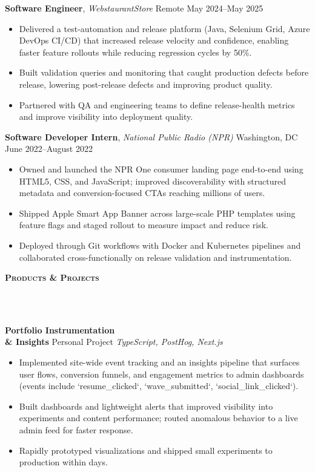 \documentclass[10pt]{article}
\newcommand{\lineunder} {
    \vspace*{-10pt} \\
    \hspace*{-18pt} \hrulefill \\
    \vspace*{2pt}
}
\newcommand{\header} [1] {
  \vspace*{2pt}
    {\hspace*{-15pt}\textsc{#1}}
    \lineunder
}
\begin{document}
\textbf{Software Engineer}, \textit{WebstaurantStore} \hfill Remote \textbar{} May 2024--May 2025\\
\begin{itemize}[leftmargin=5mm, itemsep=0mm]
  \item Delivered a test-automation and release platform (Java, Selenium Grid, Azure DevOps CI/CD) that increased release velocity and confidence, enabling faster feature rollouts while reducing regression cycles by 50\%.
  \item Built validation queries and monitoring that caught production defects before release, lowering post-release defects and improving product quality.
  \item Partnered with QA and engineering teams to define release-health metrics and improve visibility into deployment quality.
\end{itemize}

\textbf{Software Developer Intern}, \textit{National Public Radio (NPR)} \hfill Washington, DC \textbar{} June 2022--August 2022\\
\begin{itemize}[leftmargin=5mm, itemsep=0mm]
  \item Owned and launched the NPR One consumer landing page end-to-end using HTML5, CSS, and JavaScript; improved discoverability with structured metadata and conversion-focused CTAs reaching millions of users.
  \item Shipped Apple Smart App Banner across large-scale PHP templates using feature flags and staged rollout to measure impact and reduce risk.
  \item Deployed through Git workflows with Docker and Kubernetes pipelines and collaborated cross-functionally on release validation and instrumentation.
\end{itemize}

\header{\textbf{Products \& Projects}}

\textbf{Portfolio Instrumentation \\& Insights} \hfill Personal Project \textbar{} \textit{TypeScript, PostHog, Next.js}\\
\begin{itemize}[leftmargin=5mm, itemsep=0mm]
  \item Implemented site-wide event tracking and an insights pipeline that surfaces user flows, conversion funnels, and engagement metrics to admin dashboards (events include `resume_clicked`, `wave_submitted`, `social_link_clicked`).
  \item Built dashboards and lightweight alerts that improved visibility into experiments and content performance; routed anomalous behavior to a live admin feed for faster response.
  \item Rapidly prototyped visualizations and shipped small experiments to production within days.
\end{itemize}
\end{document}
